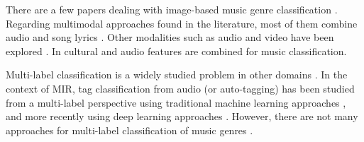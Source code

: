 There are a few papers dealing with image-based music genre classification \citep{libeks2011you}.
Regarding multimodal approaches found in the literature, most of them combine audio and song lyrics \citep{laurier2008multimodal,neumayer2007integration}. Other modalities such as audio and video have been explored \citep{schindler2015audio}. In \cite{mckay2008combining} cultural and audio features are combined for music classification. 


Multi-label classification is a widely studied problem in other domains \citep{tsoumakas2006multi,jain2016extreme}. In the context of MIR, tag classification from audio (or auto-tagging) has been studied from a multi-label perspective using traditional machine learning approaches \citep{sordo2012semantic,wang2009tag,turnbull2008semantic,bertin2008autotagger,seyerlehner2010automatic}, and more recently using deep learning approaches \citep{Choi2016,dieleman2014end}. However, there are not many approaches for multi-label classification of music genres \citep{Sanden2011,wang2009tag}.


